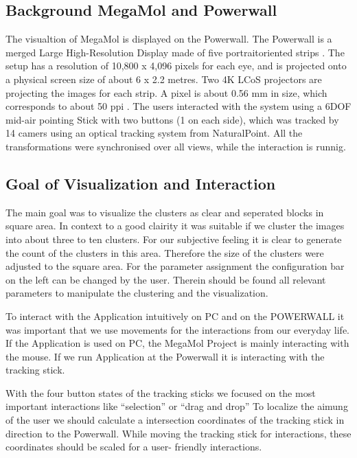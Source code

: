 \documentclass[journal]{vgtc}       %
\begin{document}
\subsection{Background MegaMol and Powerwall}


The visualtion of MegaMol is displayed on the Powerwall.
The  Powerwall is a merged Large High-Resolution Display made of five portraitoriented
strips . The setup has  a resolution of 10,800 x 4,096 pixels
for each eye, and is projected onto a physical screen size of about 6 x 2.2 metres. 
Two 4K LCoS projectors are projecting
the images for each strip.
A pixel is about 0.56 mm  in size, which corresponds to about 50 ppi .
The users interacted with the system using a 6DOF mid-air
pointing Stick with two buttons (1 on each side), which was tracked by 14 camers
using an optical tracking system from NaturalPoint. 
All the transformations were synchronised over all views, while the interaction is runnig.




\subsection{Goal of Visualization and Interaction}
The main goal was to visualize the clusters as clear and seperated blocks in square area. In context to a good clairity it was suitable if we cluster the images into about three to ten clusters. For our subjective feeling it is clear to generate the count of the clusters in this area. Therefore the size of the clusters were adjusted to the square area. For the parameter assignment the configuration bar on the left can be changed by the user. Therein should be found all relevant parameters to manipulate the clustering and the visualization.

To interact with the Application intuitively on PC and on the POWERWALL it was important that we use movements for the interactions from our everyday life. If the Application is used on PC, the MegaMol Project is mainly interacting with the mouse. If we run Application at the Powerwall it is interacting with the tracking stick.

With the four button states of the tracking sticks we focused on the most important interactions like ``selection'' or ``drag and drop'' To localize the aimung of the user  we should calculate a intersection coordinates of the tracking stick in direction to the Powerwall. While moving the tracking stick for interactions, these coordinates should be scaled for a user- friendly interactions.
\end{document}
